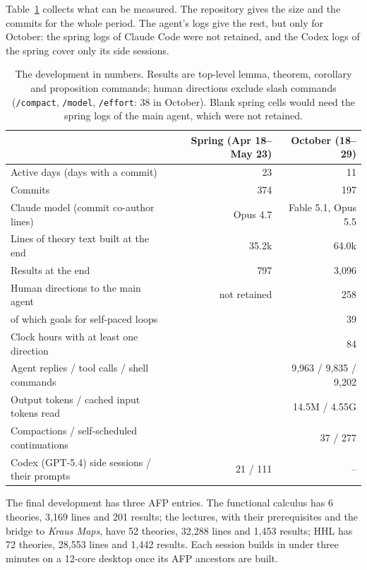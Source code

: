 Table~\ref{tab:stats} collects what can be measured. The repository gives the size and the commits
for the whole period. The agent's logs give the rest, but only for October: the spring logs of
Claude Code were not retained, and the Codex logs of the spring cover only its side sessions.

\begin{table}[t]
\caption{The development in numbers. Results are top-level \textsf{lemma}, \textsf{theorem},
\textsf{corollary} and \textsf{proposition} commands; human directions exclude slash commands
(\texttt{/compact}, \texttt{/model}, \texttt{/effort}: 38 in October). Blank spring cells would need the
spring logs of the main agent, which were not retained.}\label{tab:stats}
\centering\scriptsize
\renewcommand{\arraystretch}{1.08}
\begin{tabular}{@{}lrr@{}}
\toprule
 & Spring (Apr 18--May 23) & October (18--29)\\
\midrule
Active days (days with a commit) & 23 & 11\\
Commits & 374 & 197\\
Claude model (commit co-author lines) & Opus 4.7 & Fable 5.1, Opus 5.5\\
Lines of theory text built at the end & 35.2k & 64.0k\\
Results at the end & 797 & 3{,}096\\
Human directions to the main agent & not retained & 258\\
\quad of which goals for self-paced loops & & 39\\
Clock hours with at least one direction & & 84\\
Agent replies / tool calls / shell commands & & 9{,}963 / 9{,}835 / 9{,}202\\
Output tokens / cached input tokens read & & 14.5M / 4.55G\\
Compactions / self-scheduled continuations & & 37 / 277\\
Codex (GPT-5.4) side sessions / their prompts & 21 / 111 & --\\
\bottomrule
\end{tabular}
\end{table}

The final development has three AFP entries. The functional calculus has 6 theories, 3{,}169 lines
and 201 results; the lectures, with their prerequisites and the bridge to \emph{Kraus Maps}, have 52
theories, 32{,}288 lines and 1{,}453 results; HHL has 72 theories, 28{,}553 lines and 1{,}442 results.
Each session builds in under three minutes on a 12-core desktop once its AFP ancestors are built.

